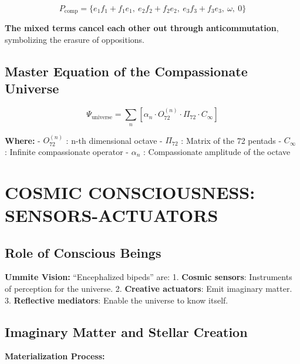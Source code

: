 \documentclass[11pt]{article}
\begin{document}
\begin{equation}
P_{\text{comp}} = \{e_1f_1 + f_1e_1,\ e_2f_2 + f_2e_2,\ e_3f_3 + f_3e_3,\ \omega,\ 0\}
\end{equation}

\textbf{The mixed terms cancel each other out through anticommutation},
symbolizing the erasure of oppositions.

\hypertarget{master-equation-of-the-compassionate-universe}{%
\subsection{Master Equation of the Compassionate
Universe}\label{master-equation-of-the-compassionate-universe}}

\begin{equation}
\Psi_{\text{universe}} = \sum_n \left[\alpha_n \cdot O_{72}^{(n)} \cdot \Pi_{72} \cdot C_{\infty}\right]
\end{equation}

\textbf{Where:} - \(O_{72}^{(n)}\) : n-th dimensional octave -
\(\Pi_{72}\) : Matrix of the 72 pentads - \(C_{\infty}\) : Infinite
compassionate operator - \(\alpha_n\) : Compassionate amplitude of the
octave

\hypertarget{cosmic-consciousness-sensors-actuators}{%
\section{COSMIC CONSCIOUSNESS:
SENSORS-ACTUATORS}\label{cosmic-consciousness-sensors-actuators}}

\hypertarget{role-of-conscious-beings}{%
\subsection{Role of Conscious Beings}\label{role-of-conscious-beings}}

\textbf{Ummite Vision:} ``Encephalized bipeds'' are: 1. \textbf{Cosmic
sensors}: Instruments of perception for the universe. 2.
\textbf{Creative actuators}: Emit imaginary matter. 3.
\textbf{Reflective mediators}: Enable the universe to know itself.

\hypertarget{imaginary-matter-and-stellar-creation}{%
\subsection{Imaginary Matter and Stellar
Creation}\label{imaginary-matter-and-stellar-creation}}

\textbf{Materialization Process:}
\end{document}
